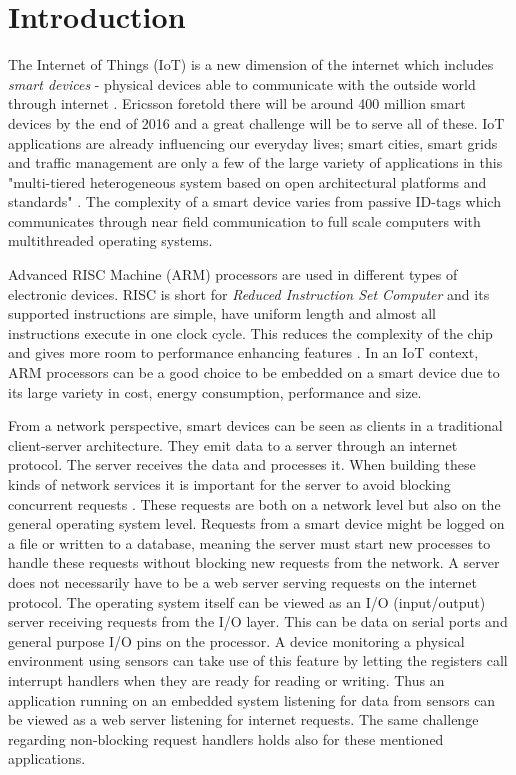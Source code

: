 \chapter{Introduction}
\label{cha:introduction}

The Internet of Things (IoT) is a new dimension of the internet which includes
\textit{smart devices} - physical devices able to communicate with the outside
world through internet
\cite{design-principles-for-distributed-embedded-applications}. Ericsson
foretold there will be around 400 million smart devices by the end of 2016
\cite{ericsson-iot-forecast} and a great challenge will be to serve all of
these. IoT applications are already influencing our everyday lives; smart
cities, smart grids and traffic management are only a few of the large variety
of applications in this "multi-tiered heterogeneous system based on open
architectural platforms and standards" \cite{gardavsevic2017iot}. The
complexity of a smart device varies from passive ID-tags which communicates
through near field communication to full scale computers with multithreaded
operating systems.

Advanced RISC Machine (ARM) processors are used in different types of
electronic devices. RISC is short for \textit{Reduced Instruction Set Computer}
and its supported instructions are simple, have uniform length and almost all
instructions execute in one clock cycle. This reduces the complexity of the
chip and gives more room to performance enhancing features \cite{risc-vs-cisc}.
In an IoT context, ARM processors can be a good choice to be embedded on a
smart device due to its large variety in cost, energy consumption, performance
and size.

From a network perspective, smart devices can be seen as clients in a
traditional client-server architecture. They emit data to a server through an
internet protocol. The server receives the data and processes it. When building
these kinds of network services it is important for the server to avoid
blocking concurrent requests \cite{elmeleegy2004lazy}. These requests are both
on a network level but also on the general operating system level. Requests
from a smart device might be logged on a file or written to a database, meaning
the server must start new processes to handle these requests without blocking
new requests from the network. A server does not necessarily have to be a web
server serving requests on the internet protocol. The operating system itself
can be viewed as an I/O (input/output) server receiving requests from the I/O
layer. This can be data on serial ports and general purpose I/O pins on the
processor. A device monitoring a physical environment using sensors can take
use of this feature by letting the registers call interrupt handlers when they
are ready for reading or writing. Thus an application running on an embedded
system listening for data from sensors can be viewed as a web server listening
for internet requests. The same challenge regarding non-blocking request
handlers holds also for these mentioned applications.

